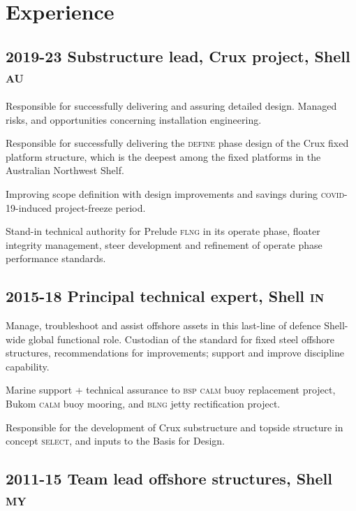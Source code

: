 \section*{Experience} %
\label{sec:exp}

\subsection*{2019-23 Substructure lead, Crux project, Shell \textsc{au}} %
\label{sub:c1}

Responsible for successfully delivering and assuring detailed design. Managed risks, and opportunities concerning installation engineering.

Responsible for successfully delivering the \textsc{define} phase design of the Crux fixed platform structure, which is the deepest among the fixed platforms in the Australian Northwest Shelf.

Improving scope definition with design improvements and savings during \textsc{covid-19}-induced project-freeze period.

Stand-in technical authority for Prelude \textsc{flng} in its operate phase, floater integrity management, steer development and refinement of operate phase performance standards.


\subsection*{2015-18 Principal technical expert, Shell \textsc{in}} %
\label{sub:c2}

Manage, troubleshoot and assist offshore assets in this last-line of defence Shell-wide global functional role. Custodian of the standard for fixed steel offshore structures, recommendations for improvements; support and improve discipline capability.

Marine support + technical assurance to \textsc{bsp} \textsc{calm} buoy replacement project, Bukom \textsc{calm} buoy mooring, and \textsc{blng} jetty rectification project.

Responsible for the development of Crux substructure and topside structure in concept \textsc{select}, and inputs to the Basis for Design.


\subsection*{2011-15 Team lead offshore structures, Shell \textsc{my}} %
\label{sub:c3}

